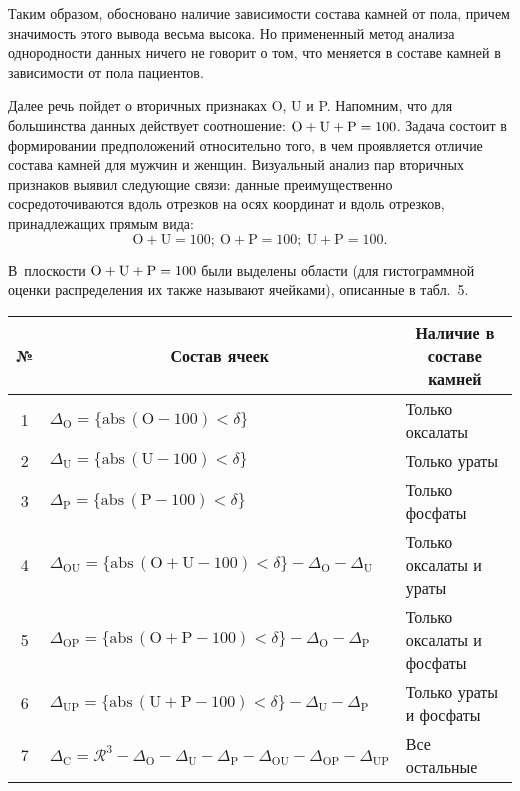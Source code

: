 \begin{multicols}{2}
      Таким образом, обосновано наличие зави\-си\-мости состава камней от пола, причем 
значимость этого вывода весьма высока. Но примененный метод анализа однородности 
данных ничего не говорит о том, что меняется в составе камней в зависимости от пола 
пациентов. 







Далее речь пойдет о вторичных признаках O, U и P. Напомним, что для 
большинства данных действует соотношение: 
$\mathrm{O}\hm+\mathrm{U}\hm+\mathrm{P}\hm=100$. Задача состоит в формировании 
предположений относительно того, в чем проявляется отличие состава камней для мужчин и 
женщин. Визуальный анализ пар вторичных признаков выявил следующие связи: данные 
преимущественно сосредоточиваются вдоль отрезков на осях координат и вдоль отрезков, 
принадлежащих прямым вида: 
$$
\mathrm{O}+\mathrm{U}=100;\  
\mathrm{O}+\mathrm{P}=100;\ \mathrm{U}+\mathrm{P}=100.
$$

В~плоскости 
$\mathrm{O}\hm+\mathrm{U}\hm+\mathrm{P}\hm=100$ были выделены области (для 
гистограммной оценки распределения их также называют ячейками), описанные в табл.~5.

\begin{table*}\small %
\begin{center}
\vspace*{2ex}

\begin{tabular}{|c|l|l|}
\hline
№&\multicolumn{1}{c|}{Состав ячеек}&\multicolumn{1}{c|}{Наличие в составе камней}\\
\hline
1&$\Delta_{\mathrm{O}}=\{\mathrm{abs}\,(\mathrm{O}-100)<\delta\}$&Только оксалаты\\
2&$\Delta_{\mathrm{U}}=\{\mathrm{abs}\,(\mathrm{U}-100)<\delta\}$&Только ураты\\
3&$\Delta_{\mathrm{P}}=\{\mathrm{abs}\,(\mathrm{P}-100)<\delta\}$&Только фосфаты\\
4&$\Delta_{\mathrm{OU}}= \{\mathrm{abs}\,(\mathrm{O+U-100})<\delta\}-\Delta_{\mathrm{O}}-
\Delta_{\mathrm{U}}$&Только оксалаты и ураты\\
5&$\Delta_{\mathrm{OP}}= \{\mathrm{abs}\,(\mathrm{O+P-100})<\delta\}-\Delta_{\mathrm{O}}-
\Delta_{\mathrm{P}}$&Только оксалаты и фосфаты\\
6&$\Delta_{\mathrm{UP}}= \{\mathrm{abs}\,(\mathrm{U+P-100})<\delta\}-\Delta_{\mathrm{U}}-
\Delta_{\mathrm{P}}$&Только ураты и фосфаты\\
7&$\Delta_{\mathrm{C}}=\mathcal{R}^3-\Delta_{\mathrm{O}}-\Delta_{\mathrm{U}}-
\Delta_{\mathrm{P}}-\Delta_{\mathrm{OU}}-\Delta_{\mathrm{OP}}-
\Delta_{\mathrm{UP}}$&Все остальные\\
\hline
\end{tabular}
\end{center}
\end{table*}


\end{multicols}
